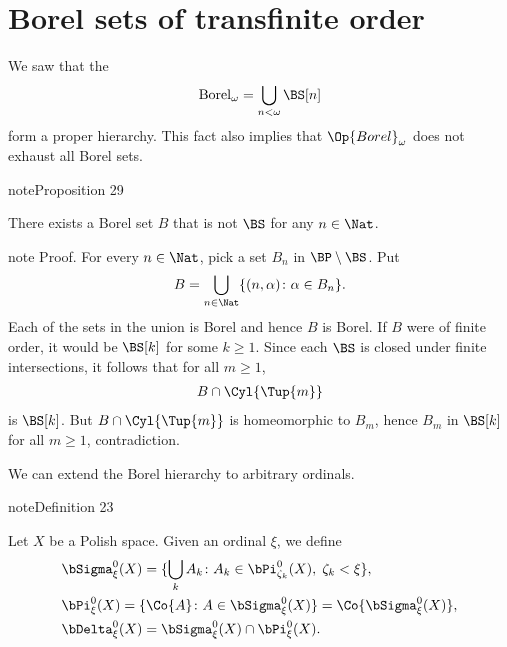 \documentclass[letterpaper,10pt,english]{jupyterBook}
\begin{document}
\section{Borel sets of transfinite order}
\label{\detokenize{structureBorel:borel-sets-of-transfinite-order}}
\sphinxAtStartPar
We saw that the 
\begin{equation*}
\begin{split}
	\operatorname{Borel}_\omega = \bigcup_{n < \omega} \BS[n]
\end{split}
\end{equation*}
\sphinxAtStartPar
form a proper hierarchy. This fact also implies that \(\Op{Borel}_\omega\) does not exhaust all Borel sets.
\label{structureBorel:prop-nonfinite-Borel}
\begin{sphinxadmonition}{note}{Proposition 29}



\sphinxAtStartPar
There exists a Borel set \(B\) that is not \(\BS\) for any \(n \in \Nat\).
\end{sphinxadmonition}

\begin{sphinxadmonition}{note}
\sphinxAtStartPar
Proof. For every \(n \in \Nat\), pick a set \(B_n\) in \(\BP \setminus \BS\). Put
\begin{equation*}
\begin{split}
    B = \bigcup_{n \in \Nat} \{(n,\alpha) \colon \alpha \in B_n \}.
\end{split}
\end{equation*}
\sphinxAtStartPar
Each of the sets in the union is Borel and hence \(B\) is Borel. If \(B\) were of finite order, it would be \(\BS[k]\) for some \(k \geq 1\). Since each \(\BS\) is closed under finite intersections, it follows that for all \(m \geq 1\),
\begin{equation*}
\begin{split}
    B \cap \Cyl{\Tup{m}} 
\end{split}
\end{equation*}
\sphinxAtStartPar
is \(\BS[k]\). But \(B \cap \Cyl{\Tup{m}}\) is homeomorphic to \(B_m\), hence \(B_m\) in \(\BS[k]\) for all \(m \geq 1\), contradiction.
\end{sphinxadmonition}

\sphinxAtStartPar
We can extend the Borel hierarchy to arbitrary ordinals.
\label{structureBorel:def-transfinite-Borel}
\begin{sphinxadmonition}{note}{Definition 23}



\sphinxAtStartPar
Let \(X\) be a Polish space. Given an ordinal \(\xi\), we define
\begin{align*}
    & \bSigma^0_\xi(X) = \{ \bigcup_k A_k \colon A_k \in \bPi^0_{\zeta_k}(X),\; \zeta_k < \xi \}, \\
    & \bPi^0_\xi(X) = \{ \Co{A} \colon A \in \bSigma^0_\xi(X) \} = \Co{\bSigma^0_\xi(X)}, \\
    & \bDelta^0_\xi(X) = \bSigma^0_\xi(X) \cap \bPi^0_\xi(X). \\
\end{align*}\end{sphinxadmonition}
\end{document}
